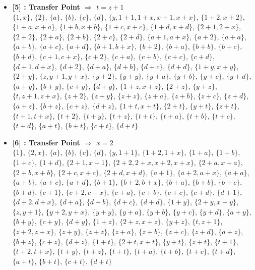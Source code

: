\begin{itemize}
    \item \textbf{[5] : Transfer Point $\Rightarrow$ $t = z + 1$}\\
        $\{1, x\}$, $\{2\}$, $\{a\}$, $\{b\}$, $\{c\}$, $\{d\}$, $\{y, 1 + 1, 1 + x, x + 1, x + x\}$, $\{1 + 2, x + 2\}$, $\{1 + a, x + a\}$, $\{1 + b, x + b\}$, $\{1 + c, x + c\}$, $\{1 + d, x + d\}$, $\{2 + 1, 2 + x\}$, $\{2 + 2\}$, $\{2 + a\}$, $\{2 + b\}$, $\{2 + c\}$, $\{2 + d\}$, $\{a + 1, a + x\}$, $\{a + 2\}$, $\{a + a\}$, $\{a + b\}$, $\{a + c\}$, $\{a + d\}$, $\{b + 1, b + x\}$, $\{b + 2\}$, $\{b + a\}$, $\{b + b\}$, $\{b + c\}$, $\{b + d\}$, $\{c + 1, c + x\}$, $\{c + 2\}$, $\{c + a\}$, $\{c + b\}$, $\{c + c\}$, $\{c + d\}$, $\{d + 1, d + x\}$, $\{d + 2\}$, $\{d + a\}$, $\{d + b\}$, $\{d + c\}$, $\{d + d\}$, $\{1 + y, x + y\}$, $\{2 + y\}$, $\{z, y + 1, y + x\}$, $\{y + 2\}$, $\{y + y\}$, $\{y + a\}$, $\{y + b\}$, $\{y + c\}$, $\{y + d\}$, $\{a + y\}$, $\{b + y\}$, $\{c + y\}$, $\{d + y\}$, $\{1 + z, x + z\}$, $\{2 + z\}$, $\{y + z\}$, $\{t, z + 1, z + x\}$, $\{z + 2\}$, $\{z + y\}$, $\{z + z\}$, $\{z + a\}$, $\{z + b\}$, $\{z + c\}$, $\{z + d\}$, $\{a + z\}$, $\{b + z\}$, $\{c + z\}$, $\{d + z\}$, $\{1 + t, x + t\}$, $\{2 + t\}$, $\{y + t\}$, $\{z + t\}$, $\{t + 1, t + x\}$, $\{t + 2\}$, $\{t + y\}$, $\{t + z\}$, $\{t + t\}$, $\{t + a\}$, $\{t + b\}$, $\{t + c\}$, $\{t + d\}$, $\{a + t\}$, $\{b + t\}$, $\{c + t\}$, $\{d + t\}$

    \item \textbf{[6] : Transfer Point $\Rightarrow$ $x = 2$}\\
        $\{1\}$, $\{2, x\}$, $\{a\}$, $\{b\}$, $\{c\}$, $\{d\}$, $\{y, 1 + 1\}$, $\{1 + 2, 1 + x\}$, $\{1 + a\}$, $\{1 + b\}$, $\{1 + c\}$, $\{1 + d\}$, $\{2 + 1, x + 1\}$, $\{2 + 2, 2 + x, x + 2, x + x\}$, $\{2 + a, x + a\}$, $\{2 + b, x + b\}$, $\{2 + c, x + c\}$, $\{2 + d, x + d\}$, $\{a + 1\}$, $\{a + 2, a + x\}$, $\{a + a\}$, $\{a + b\}$, $\{a + c\}$, $\{a + d\}$, $\{b + 1\}$, $\{b + 2, b + x\}$, $\{b + a\}$, $\{b + b\}$, $\{b + c\}$, $\{b + d\}$, $\{c + 1\}$, $\{c + 2, c + x\}$, $\{c + a\}$, $\{c + b\}$, $\{c + c\}$, $\{c + d\}$, $\{d + 1\}$, $\{d + 2, d + x\}$, $\{d + a\}$, $\{d + b\}$, $\{d + c\}$, $\{d + d\}$, $\{1 + y\}$, $\{2 + y, x + y\}$, $\{z, y + 1\}$, $\{y + 2, y + x\}$, $\{y + y\}$, $\{y + a\}$, $\{y + b\}$, $\{y + c\}$, $\{y + d\}$, $\{a + y\}$, $\{b + y\}$, $\{c + y\}$, $\{d + y\}$, $\{1 + z\}$, $\{2 + z, x + z\}$, $\{y + z\}$, $\{t, z + 1\}$, $\{z + 2, z + x\}$, $\{z + y\}$, $\{z + z\}$, $\{z + a\}$, $\{z + b\}$, $\{z + c\}$, $\{z + d\}$, $\{a + z\}$, $\{b + z\}$, $\{c + z\}$, $\{d + z\}$, $\{1 + t\}$, $\{2 + t, x + t\}$, $\{y + t\}$, $\{z + t\}$, $\{t + 1\}$, $\{t + 2, t + x\}$, $\{t + y\}$, $\{t + z\}$, $\{t + t\}$, $\{t + a\}$, $\{t + b\}$, $\{t + c\}$, $\{t + d\}$, $\{a + t\}$, $\{b + t\}$, $\{c + t\}$, $\{d + t\}$


\end{itemize}
